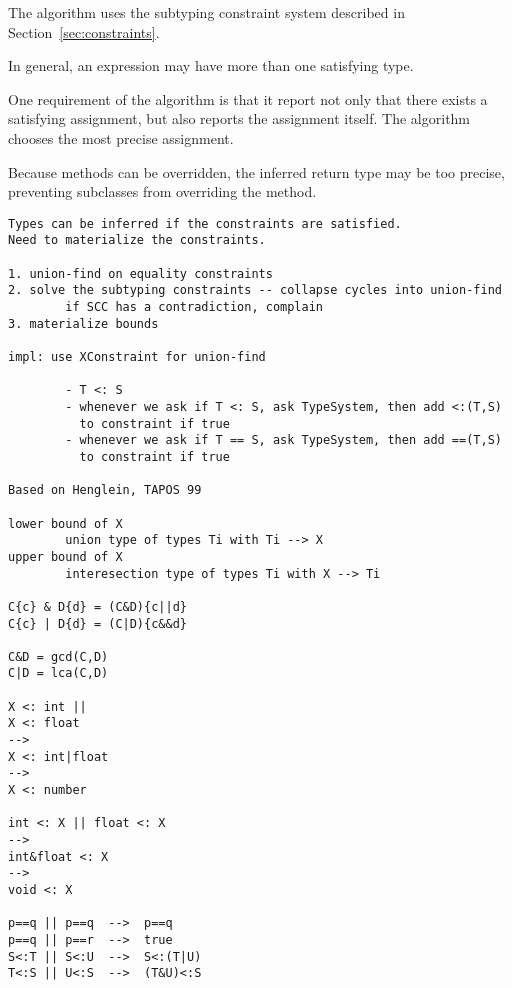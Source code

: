 \documentclass[preprint,nocopyrightspace,9pt]{sigplanconf}
\begin{document}
The algorithm uses the subtyping constraint system described in
Section~\ref{sec:constraints}.

In general, an expression may have more than one satisfying type.

One requirement of the algorithm
is that it report not only that there exists a satisfying
assignment, but also reports the assignment itself.
The algorithm chooses the most precise assignment.

Because methods can be overridden, the inferred return type may be too
precise, preventing subclasses from overriding the method.


\begin{verbatim}
Types can be inferred if the constraints are satisfied.
Need to materialize the constraints.

1. union-find on equality constraints
2. solve the subtyping constraints -- collapse cycles into union-find
        if SCC has a contradiction, complain
3. materialize bounds

impl: use XConstraint for union-find

        - T <: S
        - whenever we ask if T <: S, ask TypeSystem, then add <:(T,S)
          to constraint if true
        - whenever we ask if T == S, ask TypeSystem, then add ==(T,S)
          to constraint if true

Based on Henglein, TAPOS 99

lower bound of X
        union type of types Ti with Ti --> X
upper bound of X
        interesection type of types Ti with X --> Ti

C{c} & D{d} = (C&D){c||d}
C{c} | D{d} = (C|D){c&&d}

C&D = gcd(C,D)
C|D = lca(C,D)

X <: int ||
X <: float
-->
X <: int|float
-->
X <: number

int <: X || float <: X
-->
int&float <: X
-->
void <: X

p==q || p==q  -->  p==q
p==q || p==r  -->  true
S<:T || S<:U  -->  S<:(T|U)
T<:S || U<:S  -->  (T&U)<:S

\end{verbatim}
\end{document}
